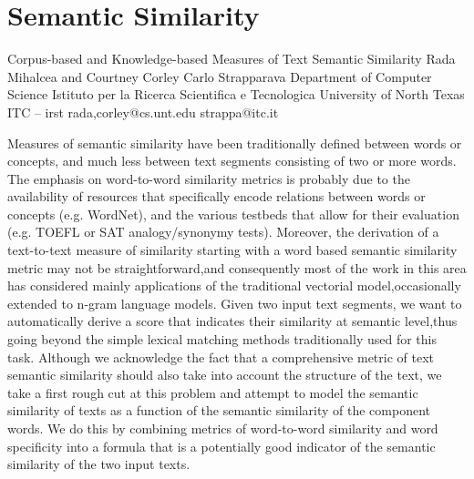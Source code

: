 
\section{Semantic Similarity}
            Corpus-based and Knowledge-based Measures
                           of Text Semantic Similarity
Rada Mihalcea and Courtney Corley                      Carlo Strapparava
     Department of Computer Science       Istituto per la Ricerca Scientifica e Tecnologica
        University of North Texas                              ITC – irst
        {rada,corley}@cs.unt.edu                            strappa@itc.it


Measures of semantic similarity have been traditionally defined between words or concepts, and much less between text segments consisting of two or more words. The emphasis on word-to-word similarity metrics is probably due to the availability of resources that specifically encode relations between words or concepts (e.g. WordNet), and the various testbeds that allow for their evaluation (e.g. TOEFL or SAT analogy/synonymy tests). Moreover, the derivation of a text-to-text measure of similarity starting with a word based semantic similarity metric may not be straightforward,and consequently most of the work in this area has considered mainly applications of the traditional vectorial model,occasionally extended to n-gram language models.
Given two input text segments, we want to automatically derive a score that indicates their similarity at semantic level,thus going beyond the simple lexical matching methods traditionally used for this task. Although we acknowledge the fact that a comprehensive metric of text semantic similarity  should also take into account the structure of the text, we take a first rough cut at this problem and attempt to model the semantic similarity of texts as a function of the semantic similarity of the component words. We do this by combining metrics of word-to-word similarity and word specificity into a formula that is a potentially good indicator of the semantic similarity of the two input texts.\\
